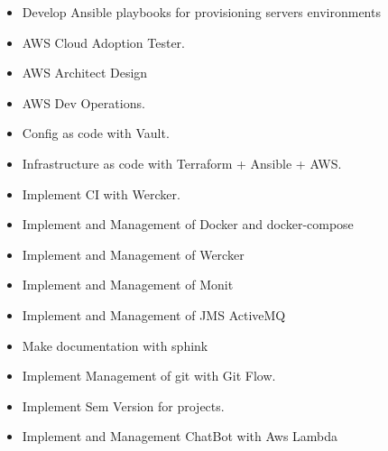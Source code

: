 \documentclass[10pt,a4paper]{altacv}
\begin{document}

\begin{fullwidth}
\makecvheader
\end{fullwidth}


\begin{itemize}
  \item Develop Ansible playbooks for provisioning servers environments
  \item AWS Cloud Adoption Tester.
  \item AWS Architect Design
  \item AWS Dev Operations.
  \item Config as code with Vault.
  \item Infrastructure as code with Terraform + Ansible + AWS.
  \item Implement CI with Wercker.
  \item Implement and Management of Docker and docker-compose
  \item Implement and Management of Wercker
  \item Implement and Management of Monit
  \item Implement and Management of JMS ActiveMQ
  \item Make documentation with sphink
  \item Implement Management of git with Git Flow.
  \item Implement Sem Version for projects.
  \item Implement and Management ChatBot with Aws Lambda
\end{itemize}
\end{document}
